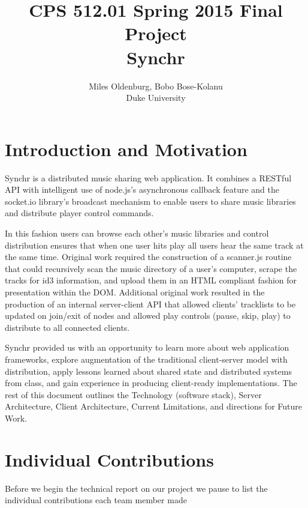 \documentclass[12pt]{article}
\title{CPS 512.01 Spring 2015 Final Project \\ Synchr}
\author{Miles Oldenburg, Bobo Bose-Kolanu \\ Duke University}
\begin{document}
\maketitle

\newpage

\tableofcontents

\newpage

\section{Introduction and Motivation}

Synchr is a distributed music sharing web application. It combines a RESTful API with intelligent use of node.js's asynchronous callback feature and the socket.io library's broadcast mechanism to enable users to share music libraries and distribute player control commands. 

In this fashion users can browse each other's music libraries and control distribution ensures that when one user hits play all users hear the same track at the same time. Original work required the construction of a scanner.js routine that could recursively scan the music directory of a user's computer, scrape the tracks for id3 information, and upload them in an HTML compliant fashion for presentation within the DOM. Additional original work resulted in the production of an internal server-client API that allowed clients' tracklists to be updated on join/exit of nodes and allowed play controls (pause, skip, play) to distribute to all connected clients.

Synchr provided us with an opportunity to learn more about web application frameworks, explore augmentation of the traditional client-server model with distribution, apply lessons learned about shared state and distributed systems from class, and gain experience in producing client-ready implementations. The rest of this document outlines the Technology (software stack), Server Architecture, Client Architecture, Current Limitations, and directions for Future Work.

\section{Individual Contributions}
Before we begin the technical report on our project we pause to list the individual contributions each team member made
\\
\end{document}

